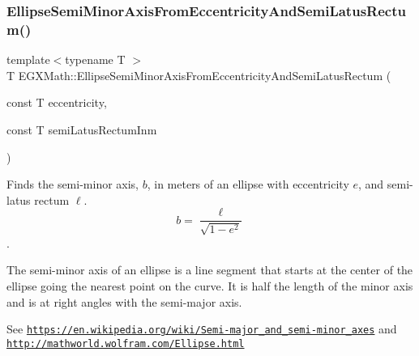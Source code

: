 \mbox{\label{group___e_g_x_math-_geometry-2_d-_ellipse-_semi_minor_axis_ga1194f5481c66c492147a27b9e167df4f}} 
\subsubsection{\texorpdfstring{Ellipse\+Semi\+Minor\+Axis\+From\+Eccentricity\+And\+Semi\+Latus\+Rectum()}{EllipseSemiMinorAxisFromEccentricityAndSemiLatusRectum()}}
{\footnotesize\ttfamily template$<$typename T $>$ \\
T E\+G\+X\+Math\+::\+Ellipse\+Semi\+Minor\+Axis\+From\+Eccentricity\+And\+Semi\+Latus\+Rectum (\begin{DoxyParamCaption}\item[{const T}]{eccentricity,  }\item[{const T}]{semi\+Latus\+Rectum\+Inm }\end{DoxyParamCaption})}



Finds the semi-\/minor axis, $b$, in meters of an ellipse with eccentricity $e$, and semi-\/latus rectum $\ell$. \[ b=\dfrac{\ell}{\sqrt{1 - e^2}} \]. 

The semi-\/minor axis of an ellipse is a line segment that starts at the center of the ellipse going the nearest point on the curve. It is half the length of the minor axis and is at right angles with the semi-\/major axis.

See \href{https://en.wikipedia.org/wiki/Semi-major_and_semi-minor_axes}{\tt https\+://en.\+wikipedia.\+org/wiki/\+Semi-\/major\+\_\+and\+\_\+semi-\/minor\+\_\+axes} and \href{http://mathworld.wolfram.com/Ellipse.html}{\tt http\+://mathworld.\+wolfram.\+com/\+Ellipse.\+html}


